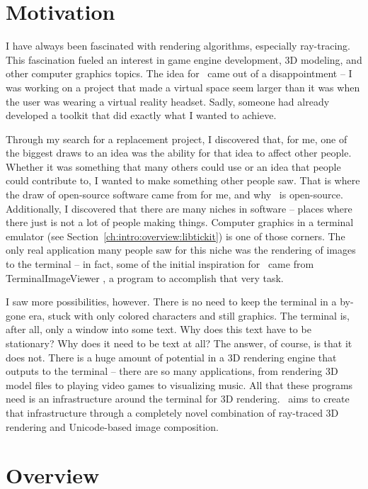 \section{Motivation}
\label{ch:intro:motivation}

I have always been fascinated with rendering algorithms, especially ray-tracing.
This fascination fueled an interest in game engine development, 3D modeling, and other computer graphics topics.
The idea for \name\ came out of a disappointment -- I was working on a project that made a virtual space seem larger than it was when the user was wearing a virtual reality headset.
Sadly, someone had already developed a toolkit that did exactly what I wanted to achieve.

Through my search for a replacement project, I discovered that, for me, one of the biggest draws to an idea was the ability for that idea to affect other people.
Whether it was something that many others could use or an idea that people could contribute to, I wanted to make something other people saw.
That is where the draw of open-source software came from for me, and why \name\ is open-source.
Additionally, I discovered that there are many niches in software -- places where there just is not a lot of people making things.
Computer graphics in a terminal emulator (see Section~\ref{ch:intro:overview:libtickit}) is one of those corners.
The only real application many people saw for this niche was the rendering of images to the terminal -- in fact, some of the initial inspiration for \name\ came from TerminalImageViewer \cite{tivGithub}, a program to accomplish that very task.

I saw more possibilities, however.
There is no need to keep the terminal in a by-gone era, stuck with only colored characters and still graphics.
The terminal is, after all, only a window into some text.
Why does this text have to be stationary?
Why does it need to be text at all?
The answer, of course, is that it does not.
There is a huge amount of potential in a 3D rendering engine that outputs to the terminal -- there are so many applications, from rendering 3D model files to playing video games to visualizing music.
All that these programs need is an infrastructure around the terminal for 3D rendering.
\name\ aims to create that infrastructure through a completely novel combination of ray-traced 3D rendering and Unicode-based image composition.

\section{Overview}
\label{ch:intro:overview}

